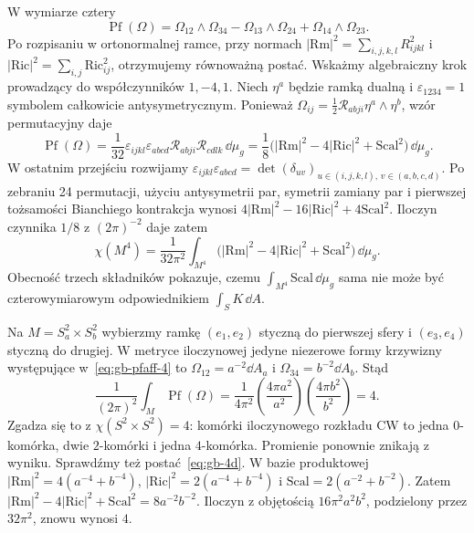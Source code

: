 W wymiarze cztery
\begin{equation}\label{eq:gb-pfaff-4}
 \operatorname{Pf}(\Omega)=
 \Omega_{12}\wedge\Omega_{34}
 -\Omega_{13}\wedge\Omega_{24}
 +\Omega_{14}\wedge\Omega_{23}.
\end{equation}
Po rozpisaniu w ortonormalnej ramce, przy normach
$|\mathrm{Rm}|^2=\sum_{i,j,k,l}R_{ijkl}^2$ i
$|\mathrm{Ric}|^2=\sum_{i,j}\mathrm{Ric}_{ij}^2$,
otrzymujemy równoważną postać. Wskażmy algebraiczny krok
prowadzący do współczynników $1,-4,1$. Niech $\eta^a$
będzie ramką dualną i $\varepsilon_{1234}=1$ symbolem
całkowicie antysymetrycznym. Ponieważ
$\Omega_{ij}=\frac12\mathcal R_{abji}\eta^a\wedge\eta^b$,
wzór permutacyjny daje
\[
 \operatorname{Pf}(\Omega)
 =\frac1{32}\varepsilon_{ijkl}\varepsilon_{abcd}
       \mathcal R_{abji}\mathcal R_{cdlk}\,\dd\mu_g
 =\frac18\bigl(|\mathrm{Rm}|^2-4|\mathrm{Ric}|^2
                         +\mathrm{Scal}^2\bigr)\,\dd\mu_g.
\]
W ostatnim przejściu rozwijamy
$\varepsilon_{ijkl}\varepsilon_{abcd}
=\det(\delta_{u v})_{u\in(i,j,k,l),\,v\in(a,b,c,d)}$.
Po zebraniu 24 permutacji, użyciu antysymetrii par,
symetrii zamiany par i pierwszej tożsamości Bianchiego
kontrakcja wynosi
$4|\mathrm{Rm}|^2-16|\mathrm{Ric}|^2+4\mathrm{Scal}^2$.
Iloczyn czynnika $1/8$ z $(2\pi)^{-2}$ daje zatem
\begin{equation}\label{eq:gb-4d}
 \chi(M^4)=\frac1{32\pi^2}\int_{M^4}
 \bigl(|\mathrm{Rm}|^2-4|\mathrm{Ric}|^2
                    +\mathrm{Scal}^2\bigr)\,\dd\mu_g.
\end{equation}
Obecność trzech składników pokazuje, czemu
$\int_{M^4}\mathrm{Scal}\,\dd\mu_g$ sama nie może być
czterowymiarowym odpowiednikiem $\int_S K\,\dd A$.

\begin{przyklad}
Na $M=S_a^2\times S_b^2$ wybierzmy ramkę $(e_1,e_2)$
styczną do pierwszej sfery i $(e_3,e_4)$ styczną do
drugiej. W metryce iloczynowej jedyne niezerowe formy
krzywizny występujące w~\eqref{eq:gb-pfaff-4} to
$\Omega_{12}=a^{-2}\dd A_a$ i
$\Omega_{34}=b^{-2}\dd A_b$. Stąd
\[
 \frac1{(2\pi)^2}\int_M\operatorname{Pf}(\Omega)
 =\frac1{4\pi^2}
   \left(\frac{4\pi a^2}{a^2}\right)
   \left(\frac{4\pi b^2}{b^2}\right)=4.
\]
Zgadza się to z $\chi(S^2\times S^2)=4$:
komórki iloczynowego rozkładu CW to jedna $0$-komórka,
dwie $2$-komórki i jedna $4$-komórka. Promienie ponownie
znikają z wyniku.
Sprawdźmy też postać~\eqref{eq:gb-4d}.
W bazie produktowej $|\mathrm{Rm}|^2=4(a^{-4}+b^{-4})$,
$|\mathrm{Ric}|^2=2(a^{-4}+b^{-4})$ i
$\mathrm{Scal}=2(a^{-2}+b^{-2})$.
Zatem $|\mathrm{Rm}|^2-4|\mathrm{Ric}|^2+\mathrm{Scal}^2
=8a^{-2}b^{-2}$. Iloczyn z objętością
$16\pi^2a^2b^2$, podzielony przez $32\pi^2$,
znowu wynosi $4$.
\end{przyklad}

